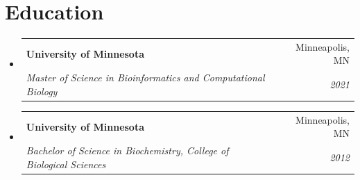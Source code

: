 \documentclass[letterpaper,10pt]{article}
\makeatletter
\newcommand{\resumeSubheading}[4]{
  \vspace{-2pt}\item
    \begin{tabular*}{0.97\textwidth}[t]{l@{\extracolsep{\fill}}r}
      \textbf{#1} & #2 \\
      \textit{\small#3} & \textit{\small #4} \\
    \end{tabular*}\vspace{-7pt}
}
\newcommand{\resumeSubHeadingListStart}{\begin{itemize}[leftmargin=0.15in, label={}]}
\newcommand{\resumeSubHeadingListEnd}{\end{itemize}}
\makeatother
\begin{document}
\section{Education}
  \resumeSubHeadingListStart
    \resumeSubheading
      {University of Minnesota}{Minneapolis, MN}
      {Master of Science in Bioinformatics and Computational Biology}{2021}
    \resumeSubheading
      {University of Minnesota}{Minneapolis, MN}
      {Bachelor of Science in Biochemistry, College of Biological Sciences}{2012}
  \resumeSubHeadingListEnd

\end{document}
